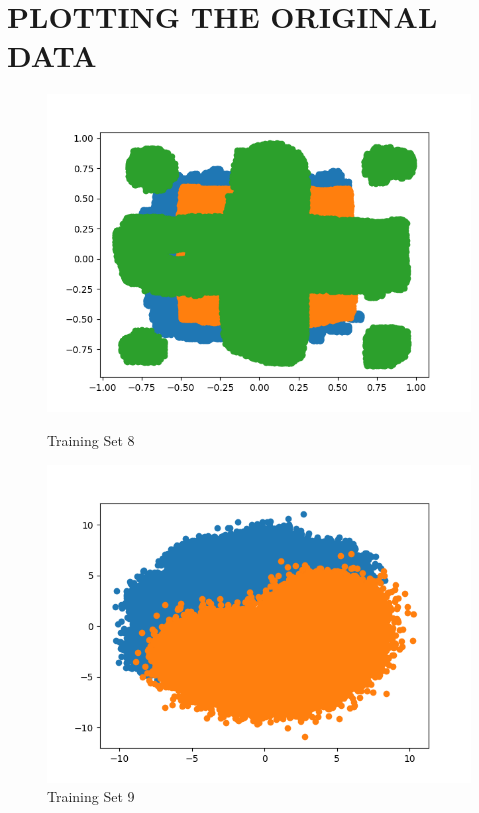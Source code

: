 \documentclass{article}
\begin{document}
\section{\MakeUppercase{Plotting The Original Data}}
\begin{figure}[H]
	\centering
	\begin{minipage}{.33\textwidth}
			\centering
			\includegraphics[width=1\linewidth]{../Trainset 08.png}
			\caption{Training Set 8}
	\end{minipage}\hfill
        \centering
	\begin{minipage}{.33\textwidth}
			\centering
			\includegraphics[width=1\linewidth]{../TrainSet 09.png}
			\caption{Training Set 9}
	\end{minipage}\hfill

\end{figure}
\end{document}
